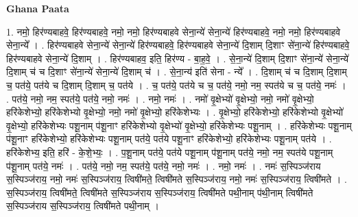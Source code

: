 \documentclass[17pt]{extarticle}
\begin{document}
\textbf{Ghana Paata } \newline

1. नमो॒ हिर॑ण्यबाहवे॒ हिर॑ण्यबाहवे॒ नमो॒ नमो॒ हिर॑ण्यबाहवे सेना॒न्ये॑ सेना॒न्ये॑ हिर॑ण्यबाहवे॒ नमो॒ नमो॒ हिर॑ण्यबाहवे सेना॒न्ये᳚ । . हिर॑ण्यबाहवे सेना॒न्ये॑ सेना॒न्ये॑ हिर॑ण्यबाहवे॒ हिर॑ण्यबाहवे सेना॒न्ये॑ दि॒शाम् दि॒शाꣳ से॑ना॒न्ये॑ हिर॑ण्यबाहवे॒ हिर॑ण्यबाहवे सेना॒न्ये॑ दि॒शाम् । . हिर॑ण्यबाहव॒ इति॒ हिर॑ण्य - बा॒ह॒वे॒ । . से॒ना॒न्ये॑ दि॒शाम् दि॒शाꣳ से॑ना॒न्ये॑ सेना॒न्ये॑ दि॒शाम् च॑ च दि॒शाꣳ से॑ना॒न्ये॑ सेना॒न्ये॑ दि॒शाम् च॑ । . से॒ना॒न्य॑ इति॑ सेना - न्ये᳚ । . दि॒शाम् च॑ च दि॒शाम् दि॒शाम् च॒ पत॑ये॒ पत॑ये च दि॒शाम् दि॒शाम् च॒ पत॑ये । . च॒ पत॑ये॒ पत॑ये च च॒ पत॑ये॒ नमो॒ नम॒ स्पत॑ये च च॒ पत॑ये॒ नमः॑ । . पत॑ये॒ नमो॒ नम॒ स्पत॑ये॒ पत॑ये॒ नमो॒ नमः॑ । . नमो॒ नमः॑ । . नमो॑ वृ॒क्षेभ्यो॑ वृ॒क्षेभ्यो॒ नमो॒ नमो॑ वृ॒क्षेभ्यो॒ हरि॑केशेभ्यो॒ हरि॑केशेभ्यो वृ॒क्षेभ्यो॒ नमो॒ नमो॑ वृ॒क्षेभ्यो॒ हरि॑केशेभ्यः । . वृ॒क्षेभ्यो॒ हरि॑केशेभ्यो॒ हरि॑केशेभ्यो वृ॒क्षेभ्यो॑ वृ॒क्षेभ्यो॒ हरि॑केशेभ्यः पशू॒नाम् प॑शू॒नाꣳ हरि॑केशेभ्यो वृ॒क्षेभ्यो॑ वृ॒क्षेभ्यो॒ हरि॑केशेभ्यः पशू॒नाम् । . हरि॑केशेभ्यः पशू॒नाम् प॑शू॒नाꣳ हरि॑केशेभ्यो॒ हरि॑केशेभ्यः पशू॒नाम् पत॑ये॒ पत॑ये पशू॒नाꣳ हरि॑केशेभ्यो॒ हरि॑केशेभ्यः पशू॒नाम् पत॑ये । . हरि॑केशेभ्य॒ इति॒ हरि॑ - के॒शे॒भ्यः॒ । . प॒शू॒नाम् पत॑ये॒ पत॑ये पशू॒नाम् प॑शू॒नाम् पत॑ये॒ नमो॒ नम॒ स्पत॑ये पशू॒नाम् प॑शू॒नाम् पत॑ये॒ नमः॑ । . पत॑ये॒ नमो॒ नम॒ स्पत॑ये॒ पत॑ये॒ नमो॒ नमः॑ । . नमो॒ नमः॑ । . नमः॑ स॒स्पिञ्ज॑राय स॒स्पिञ्ज॑राय॒ नमो॒ नमः॑ स॒स्पिञ्ज॑राय॒ त्विषी॑मते॒ त्विषी॑मते स॒स्पिञ्ज॑राय॒ नमो॒ नमः॑ स॒स्पिञ्ज॑राय॒ त्विषी॑मते । . स॒स्पिञ्ज॑राय॒ त्विषी॑मते॒ त्विषी॑मते स॒स्पिञ्ज॑राय स॒स्पिञ्ज॑राय॒ त्विषी॑मते पथी॒नाम् प॑थी॒नाम् त्विषी॑मते स॒स्पिञ्ज॑राय स॒स्पिञ्ज॑राय॒ त्विषी॑मते पथी॒नाम् । \newline
\end{document}
